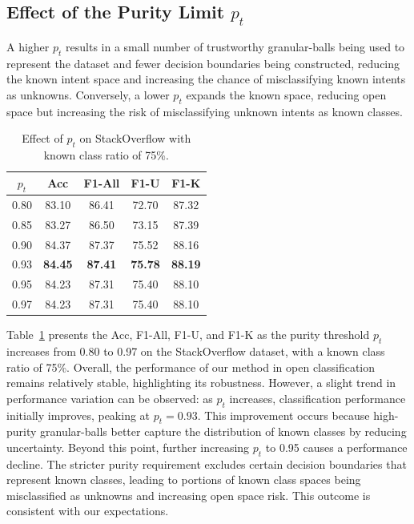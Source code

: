 \documentclass[letterpaper]{article} %
\theoremstyle{definition}
\begin{document}
\subsection{Effect of the Purity Limit $p_t$}
A higher $p_t$ results in a small number of trustworthy granular-balls being used to represent the dataset and fewer decision boundaries being constructed, reducing the known intent space and increasing the chance of misclassifying known intents as unknowns. Conversely, a lower $p_t$ expands the known space, reducing open space but increasing the risk of misclassifying unknown intents as known classes.
\begin{table}[t]
\centering
\begin{tabular}{c|cc cc }
\hline
$p_t$  & Acc & F1-All   & F1-U & F1-K\\ \hline
0.80 & 83.10 & 86.41 & 72.70 & 87.32 \\
0.85 & 83.27 & 86.50 & 73.15 & 87.39 \\
0.90 & 84.37 & 87.37 & 75.52 & 88.16 \\
0.93 & \textbf{84.45} & \textbf{87.41} & \textbf{75.78} & \textbf{88.19} \\
0.95 & 84.23 & 87.31 & 75.40 & 88.10 \\
0.97 & 84.23 & 87.31 & 75.40 & 88.10 \\
\hline
\end{tabular}
\caption{Effect of $p_t$ on StackOverflow with known class ratio of 75\%. }
\label{tab:4}
\end{table}

Table~\ref{tab:4} presents the Acc, F1-All, F1-U, and F1-K as the purity threshold \(p_t\) increases from 0.80 to 0.97 on the StackOverflow dataset, with a known class ratio of 75\%. Overall, the performance of our method in open classification remains relatively stable, highlighting its robustness. However, a slight trend in performance variation can be observed: as \(p_t\) increases, classification performance initially improves, peaking at \(p_t = 0.93\). This improvement occurs because high-purity granular-balls better capture the distribution of known classes by reducing uncertainty. Beyond this point, further increasing \(p_t\) to 0.95 causes a performance decline. The stricter purity requirement excludes certain decision boundaries that represent known classes, leading to portions of known class spaces being misclassified as unknowns and increasing open space risk. This outcome is consistent with our expectations.
\end{document}
